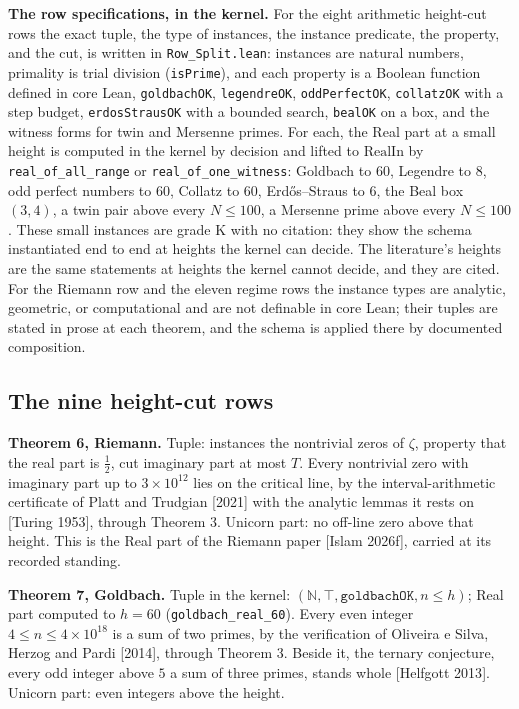 \documentclass[10pt]{article}
\begin{document}
\textbf{The row specifications, in the kernel.} For the eight arithmetic
height-cut rows the exact tuple, the type of instances, the instance
predicate, the property, and the cut, is written in
\texttt{Row\_Split.lean}: instances are natural numbers, primality is
trial division (\texttt{isPrime}), and each property is a Boolean
function defined in core Lean, \texttt{goldbachOK}, \texttt{legendreOK},
\texttt{oddPerfectOK}, \texttt{collatzOK} with a step budget,
\texttt{erdosStrausOK} with a bounded search, \texttt{bealOK} on a box,
and the witness forms for twin and Mersenne primes. For each, the Real
part at a small height is computed in the kernel by decision and lifted
to \(\mathrm{RealIn}\) by \texttt{real\_of\_all\_range} or
\texttt{real\_of\_one\_witness}: Goldbach to \(60\), Legendre to \(8\),
odd perfect numbers to \(60\), Collatz to \(60\), Erdős--Straus to
\(6\), the Beal box \((3, 4)\), a twin pair above every \(N \le 100\), a
Mersenne prime above every \(N \le 100\). These small instances are
grade K with no citation: they show the schema instantiated end to end
at heights the kernel can decide. The literature's heights are the same
statements at heights the kernel cannot decide, and they are cited. For
the Riemann row and the eleven regime rows the instance types are
analytic, geometric, or computational and are not definable in core
Lean; their tuples are stated in prose at each theorem, and the schema
is applied there by documented composition.

\hypertarget{the-nine-height-cut-rows}{%
\subsection{The nine height-cut rows}\label{the-nine-height-cut-rows}}

\textbf{Theorem 6, Riemann.} Tuple: instances the nontrivial zeros of
\(\zeta\), property that the real part is \(\tfrac12\), cut imaginary
part at most \(T\). Every nontrivial zero with imaginary part up to
\(3 \times 10^{12}\) lies on the critical line, by the
interval-arithmetic certificate of Platt and Trudgian {[}2021{]} with
the analytic lemmas it rests on {[}Turing 1953{]}, through Theorem 3.
Unicorn part: no off-line zero above that height. This is the Real part
of the Riemann paper {[}Islam 2026f{]}, carried at its recorded
standing.

\textbf{Theorem 7, Goldbach.} Tuple in the kernel:
\((\mathbb{N}, \top, \texttt{goldbachOK}, n \le h)\); Real part computed
to \(h = 60\) (\texttt{goldbach\_real\_60}). Every even integer
\(4 \le n \le 4 \times 10^{18}\) is a sum of two primes, by the
verification of Oliveira e Silva, Herzog and Pardi {[}2014{]}, through
Theorem 3. Beside it, the ternary conjecture, every odd integer above
\(5\) a sum of three primes, stands whole {[}Helfgott 2013{]}. Unicorn
part: even integers above the height.
\end{document}
